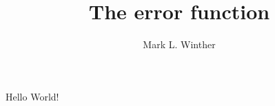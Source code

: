 \documentclass{article}
\author{Mark L. Winther}
\title{The error function}
\begin{document}
\maketitle
Hello World!
\end{document}
